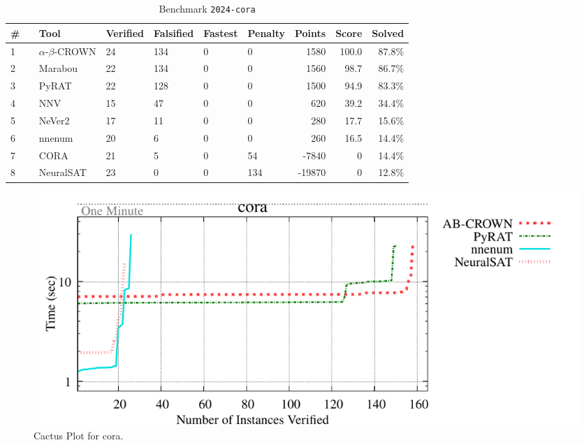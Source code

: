 \begin{table}[h]
\begin{center}
\caption{Benchmark \texttt{2024-cora}} \label{tab:cat_{cat}}
{\setlength{\tabcolsep}{2pt}
\begin{tabular}[h]{@{}llllllrrr@{}}
\toprule
\textbf{\# ~} & \textbf{Tool} & \textbf{Verified} & \textbf{Falsified} & \textbf{Fastest} & \textbf{Penalty} & \textbf{Points} & \textbf{Score} & \textbf{Solved}\\
\midrule
1 & $\alpha$-$\beta$-CROWN & 24 & 134 & 0 & 0 & 1580 & 100.0 & 87.8\% \\
2 & Marabou & 22 & 134 & 0 & 0 & 1560 & 98.7 & 86.7\% \\
3 & PyRAT & 22 & 128 & 0 & 0 & 1500 & 94.9 & 83.3\% \\
4 & NNV & 15 & 47 & 0 & 0 & 620 & 39.2 & 34.4\% \\
5 & NeVer2 & 17 & 11 & 0 & 0 & 280 & 17.7 & 15.6\% \\
6 & nnenum & 20 & 6 & 0 & 0 & 260 & 16.5 & 14.4\% \\
7 & CORA & 21 & 5 & 0 & 54 & -7840 & 0 & 14.4\% \\
8 & NeuralSAT & 23 & 0 & 0 & 134 & -19870 & 0 & 12.8\% \\
\bottomrule
\end{tabular}
}
\end{center}
\end{table}



\begin{figure}[h]
\centerline{\includegraphics[width=\textwidth]{cactus/2024_cora.pdf}}
\caption{Cactus Plot for cora.}
\label{fig:quantPic}
\end{figure}


\clearpage

